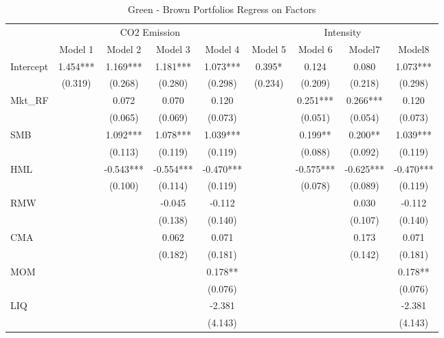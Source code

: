\documentclass[12pt]{article}
\begin{document}
\begin{table}[!ht]
\centering
\footnotesize
\caption{Green - Brown Portfolios Regress on Factors}
\label{tab: green-brown}
{
\def\sym#1{\ifmmode^{#1}\else\(^{#1}\)\fi}
\begin{tabular}{@{\extracolsep{2pt}}l*{8}{c}@{}}
\toprule
& \multicolumn{4}{c}{CO2 Emission} & \multicolumn{4}{c}{Intensity} \\
\cline{2-5}
\cline{6-9}
               & Model 1  & Model 2   & Model 3   & Model 4   & Model 5 & Model 6   & Model7    & Model8     \\
\hline
Intercept      & 1.454*** & 1.169***  & 1.181***  & 1.073***  & 0.395*  & 0.124     & 0.080     & 1.073***   \\
               & (0.319)  & (0.268)   & (0.280)   & (0.298)   & (0.234) & (0.209)   & (0.218)   & (0.298)    \\
Mkt\_RF        &          & 0.072     & 0.070     & 0.120     &         & 0.251***  & 0.266***  & 0.120      \\
               &          & (0.065)   & (0.069)   & (0.073)   &         & (0.051)   & (0.054)   & (0.073)    \\
SMB            &          & 1.092***  & 1.078***  & 1.039***  &         & 0.199**   & 0.200**   & 1.039***   \\
               &          & (0.113)   & (0.119)   & (0.119)   &         & (0.088)   & (0.092)   & (0.119)    \\
HML            &          & -0.543*** & -0.554*** & -0.470*** &         & -0.575*** & -0.625*** & -0.470***  \\
               &          & (0.100)   & (0.114)   & (0.119)   &         & (0.078)   & (0.089)   & (0.119)    \\
RMW            &          &           & -0.045    & -0.112    &         &           & 0.030     & -0.112     \\
               &          &           & (0.138)   & (0.140)   &         &           & (0.107)   & (0.140)    \\
CMA            &          &           & 0.062     & 0.071     &         &           & 0.173     & 0.071      \\
               &          &           & (0.182)   & (0.181)   &         &           & (0.142)   & (0.181)    \\
MOM            &          &           &           & 0.178**   &         &           &           & 0.178**    \\
               &          &           &           & (0.076)   &         &           &           & (0.076)    \\
LIQ            &          &           &           & -2.381    &         &           &           & -2.381     \\
               &          &           &           & (4.143)   &         &           &           & (4.143)    \\


\end{tabular}}
\end{table}
\end{document}
